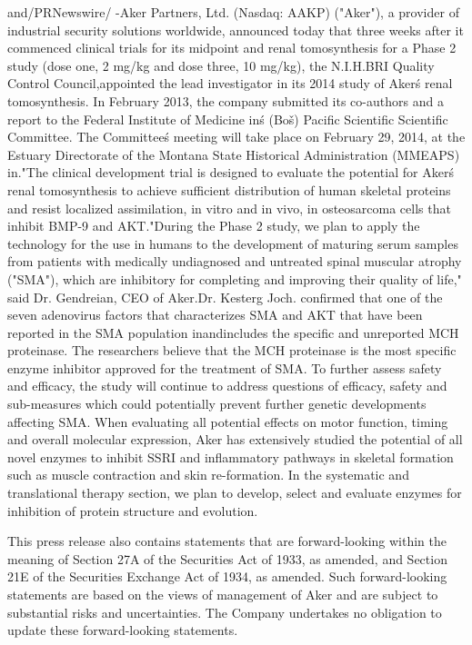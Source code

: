 \documentclass{article}
\begin{document}
and/PRNewswire/ -Aker Partners, Ltd. (Nasdaq: AAKP) ("Aker"), a provider of industrial security solutions worldwide, announced today that three weeks after it commenced clinical trials for its midpoint and renal tomosynthesis for a Phase 2 study (dose one, 2 mg/kg and dose three, 10 mg/kg), the N.I.H.BRI Quality Control Council,appointed the lead investigator in its 2014 study of Aker\'s renal tomosynthesis. In February 2013, the company submitted its co-authors and a report to the Federal Institute of Medicine in\'s (Boš) Pacific Scientific Scientific Committee. The Committee\'s meeting will take place on February 29, 2014, at the Estuary Directorate of the Montana State Historical Administration (MMEAPS) in."The clinical development trial is designed to evaluate the potential for Aker\'s renal tomosynthesis to achieve sufficient distribution of human skeletal proteins and resist localized assimilation, in vitro and in vivo, in osteosarcoma cells that inhibit BMP-9 and AKT."During the Phase 2 study, we plan to apply the technology for the use in humans to the development of maturing serum samples from patients with medically undiagnosed and untreated spinal muscular atrophy ("SMA"), which are inhibitory for completing and improving their quality of life," said Dr. Gendreian, CEO of Aker.Dr. Kesterg Joch. confirmed that one of the seven adenovirus factors that characterizes SMA and AKT that have been reported in the SMA population inandincludes the specific and unreported MCH proteinase. The researchers believe that the MCH proteinase is the most specific enzyme inhibitor approved for the treatment of SMA. To further assess safety and efficacy, the study will continue to address questions of efficacy, safety and sub-measures which could potentially prevent further genetic developments affecting SMA. When evaluating all potential effects on motor function, timing and overall molecular expression, Aker has extensively studied the potential of all novel enzymes to inhibit SSRI and inflammatory pathways in skeletal formation such as muscle contraction and skin re-formation. In the systematic and translational therapy section, we plan to develop, select and evaluate enzymes for inhibition of protein structure and evolution.

This press release also contains statements that are forward-looking within the meaning of Section 27A of the Securities Act of 1933, as amended, and Section 21E of the Securities Exchange Act of 1934, as amended. Such forward-looking statements are based on the views of management of Aker and are subject to substantial risks and uncertainties. The Company undertakes no obligation to update these forward-looking statements.
\end{document}
